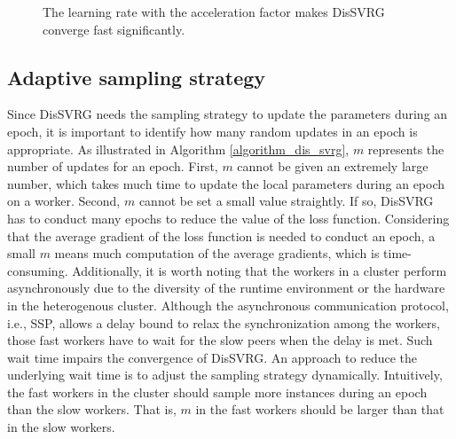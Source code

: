 \documentclass[preprint,review,11pt,a4paper]{elsarticle}
\begin{document}
\begin{figure}
\centering
{}
\caption{The learning rate with the acceleration factor makes DisSVRG converge fast significantly.}
\label{figure_evaluation_accelerated_factor}
\end{figure}

\subsection{Adaptive sampling strategy}

Since DisSVRG needs the sampling strategy to update the parameters during an epoch, it is important to identify how many random updates in an epoch is appropriate.  As illustrated in Algorithm \ref{algorithm_dis_svrg}, $m$ represents the number of updates for an epoch. First, $m$ cannot be given an extremely large number, which takes much time to update the local parameters during an epoch on a worker.  Second, $m$ cannot be set a small value straightly. If so, DisSVRG has to conduct many epochs to reduce the value of the loss function. Considering that the average gradient of the loss function is needed to conduct an epoch, a small $m$ means much computation of the average gradients, which is time-consuming.
Additionally, it is worth noting that the workers in a cluster perform asynchronously due to the diversity of the runtime environment or the hardware in the heterogenous cluster.  Although the asynchronous communication protocol, i.e., SSP, allows a delay bound to relax the synchronization among the workers, those fast workers have to wait for the slow peers when the delay is met. Such wait time impairs the convergence of DisSVRG. An approach to reduce the underlying wait time is to adjust the sampling strategy dynamically.  Intuitively, the fast workers in the cluster should sample more instances during an epoch than the slow workers. That is, $m$ in the fast workers should be larger than that in the slow workers.
\end{document}
